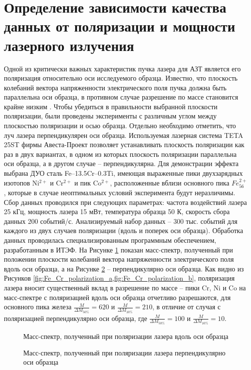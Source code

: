 \FloatBarrier

\section{Определение зависимости качества данных от поляризации и мощности лазерного излучения}\label{sec:ch3/sect2}

Одной из критически важных характеристик пучка лазера для АЗТ является его поляризация относительно оси исследуемого образца. Известно, что плоскость колебаний вектора напряженности электрического поля пучка должна быть параллельна оси образца, в противном случае разрешение по массе становится крайне низким \cite{Houard10}. Чтобы убедиться в правильности выбранной плоскости поляризации, были проведены эксперименты с различным углом между плоскостью поляризации и осью образца. Отдельно необходимо отметить, что луч лазера перпендикулярен оси образца. Используемая лазерная система TETA 25ST фирмы Авеста-Проект позволяет устанавливать плоскость поляризации как раз в двух вариантах, в одном из которых плоскость поляризации параллельна оси образца, а в другом случае – перпендикулярна. Для демонстрации эффекта выбрана ДУО сталь Fe–13.5Cr–0.3Ti, имеющая выраженные пики двухзарядных изотопов Ni$^{2+}$ и Cr$^{2+}$ и пик Co$^{2+}$, расположенные вблизи основного пика $Fe_{56} ^{2+}$, которые в случае неоптимальных условий эксперимента будут неразличимы. Сбор данных проводился при следующих параметрах: частота воздействий лазера 25 кГц, мощность лазера 15 мВт, температура образца 50 К, скорость сбора данных 200 событий/с. Анализируемый набор данных – 300 тыс. событий для каждого из двух случаев поляризации (вдоль и поперек оси образца). Обработка данных проводилась специализированным программным обеспечением, разработанным в ИТЭФ. На Рисунке \cref{fig:Fe_Cr_polarization_a} показан масс-спектр, полученный при положении плоскости колебаний вектора напряженности электрического поля вдоль оси образца, а на Рисунке \cref{fig:Fe_Cr_polarization_b} – перпендикулярно оси образца. Как видно из Рисунков \cref{fig:Fe_Cr_polarization_a,fig:Fe_Cr_polarization_b}, поляризация лазера вносит существенный вклад в разрешение по массе – пики Cr, Ni и Co на масс-спектре с поляризацией вдоль оси образца отчетливо разрешаются, для основного пика железа $\frac{M}{\Delta M_{50\%}} = 620$ и $\frac{M}{\Delta M_{10\%}} = 210$, в отличие от случая с поляризацией перпендикулярно оси образца, где $\frac{M}{\Delta M_{50\%}} = 100$ и $\frac{M}{\Delta M_{10\%}} = 10$.

\begin{figure}[htb]
	\caption{Масс-спектр, полученный при поляризации лазера вдоль оси образца}
	\label{fig:Fe_Cr_polarization_a}
\end{figure}
\begin{figure}[htb]
	\caption{Масс-спектр, полученный при поляризации лазера перпендикулярно оси образца}
	\label{fig:Fe_Cr_polarization_b}
\end{figure}


